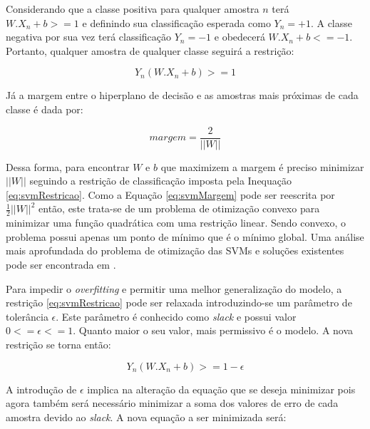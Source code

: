 \documentclass[12pt]{article}
\begin{document}
            Considerando que a classe positiva para qualquer amostra $n$ terá $W.X_n + b >= 1$ e definindo sua classificação esperada como $Y_n = +1$. A classe negativa por sua vez terá classificação $Y_n = -1$ e obedecerá $W.X_n + b <= -1$. Portanto, qualquer amostra de qualquer classe seguirá a restrição: 
            
            \begin{equation} 
            \label{eq:svmRestricao}
            Y_n(W.X_n + b) >= 1
            \end{equation}
            
            Já a margem entre o hiperplano de decisão e as amostras mais próximas de cada classe é dada por:
            
            \begin{equation} 
            \label{eq:svmMargem}
            margem = \frac{2}{||W||}
            \end{equation}
            
            Dessa forma, para encontrar $W$ e $b$ que maximizem a margem é preciso minimizar $||W||$ seguindo a restrição de classificação imposta pela Inequação \ref{eq:svmRestricao}. Como a Equação \ref{eq:svmMargem} pode ser reescrita por $\frac{1}{2}||W||^2$ então, este trata-se de um problema de otimização convexo para minimizar uma função quadrática com uma restrição linear. Sendo convexo, o problema possui apenas um ponto de mínimo que é o mínimo global. Uma análise mais aprofundada do problema de otimização das SVMs e soluções existentes pode ser encontrada em \cite{svmSolvers2007}.
            
            Para impedir o \textit{overfitting} e permitir uma melhor generalização do modelo, a restrição \ref{eq:svmRestricao} pode ser relaxada introduzindo-se um parâmetro de tolerância $\epsilon$. Este parâmetro é conhecido como \textit{slack} e possui valor $0 <= \epsilon <= 1$. Quanto maior o seu valor, mais permissivo é o modelo. A nova restrição se torna então:
            
            \begin{equation} 
            \label{eq:svmRestricaoSlack}
            Y_n(W.X_n + b) >= 1 - \epsilon
            \end{equation}
            
            A introdução de $\epsilon$ implica na alteração da equação que se deseja minimizar pois agora também será necessário minimizar a soma dos valores de erro de cada amostra devido ao \textit{slack}. A nova equação a ser minimizada será:
            
\end{document}
